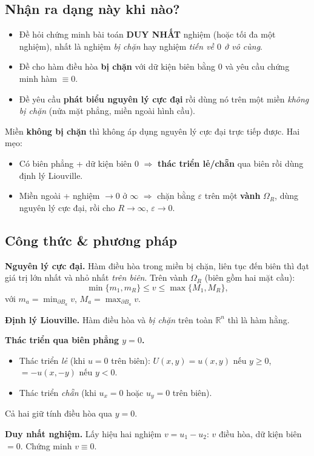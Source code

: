 \subsection*{Nhận ra dạng này khi nào?}

\begin{itemize}
  \item Đề hỏi chứng minh bài toán \textbf{DUY NHẤT} nghiệm (hoặc tối đa một nghiệm), nhất là nghiệm \emph{bị chặn} hay nghiệm \emph{tiến về $0$ ở vô cùng}.
  \item Đề cho hàm điều hòa \textbf{bị chặn} với dữ kiện biên bằng $0$ và yêu cầu chứng minh hàm $\equiv 0$.
  \item Đề yêu cầu \textbf{phát biểu nguyên lý cực đại} rồi dùng nó trên một miền \emph{không bị chặn} (nửa mặt phẳng, miền ngoài hình cầu).
\end{itemize}

\begin{meobox}
Miền \textbf{không bị chặn} thì không áp dụng nguyên lý cực đại trực tiếp được. Hai mẹo:
\begin{itemize}
  \item Có biên phẳng + dữ kiện biên $0$ $\Rightarrow$ \textbf{thác triển lẻ/chẵn} qua biên rồi dùng định lý Liouville.
  \item Miền ngoài + nghiệm $\to 0$ ở $\infty$ $\Rightarrow$ chặn bằng $\varepsilon$ trên một \textbf{vành} $\Omega_R$, dùng nguyên lý cực đại, rồi cho $R\to\infty$, $\varepsilon\to0$.
\end{itemize}
\end{meobox}

\subsection*{Công thức \& phương pháp}

\begin{nhobox}
\textbf{Nguyên lý cực đại.} Hàm điều hòa trong miền bị chặn, liên tục đến biên thì đạt giá trị lớn nhất và nhỏ nhất \emph{trên biên}. Trên vành $\Omega_R$ (biên gồm hai mặt cầu):
\[
\min\{m_1,m_R\}\le v\le \max\{M_1,M_R\},
\]
với $m_a=\min_{\partial B_a}v$, $M_a=\max_{\partial B_a}v$.

\smallskip
\textbf{Định lý Liouville.} Hàm điều hòa và \emph{bị chặn} trên toàn $\mathbb{R}^n$ thì là hàm hằng.

\smallskip
\textbf{Thác triển qua biên phẳng $y=0$.}
\begin{itemize}
  \item Thác triển \emph{lẻ} (khi $u=0$ trên biên): $U(x,y)=u(x,y)$ nếu $y\ge0$, $=-u(x,-y)$ nếu $y<0$.
  \item Thác triển \emph{chẵn} (khi $u_x=0$ hoặc $u_y=0$ trên biên).
\end{itemize}
Cả hai giữ tính điều hòa qua $y=0$.

\smallskip
\textbf{Duy nhất nghiệm.} Lấy hiệu hai nghiệm $v=u_1-u_2$: $v$ điều hòa, dữ kiện biên $=0$. Chứng minh $v\equiv0$.
\end{nhobox}

